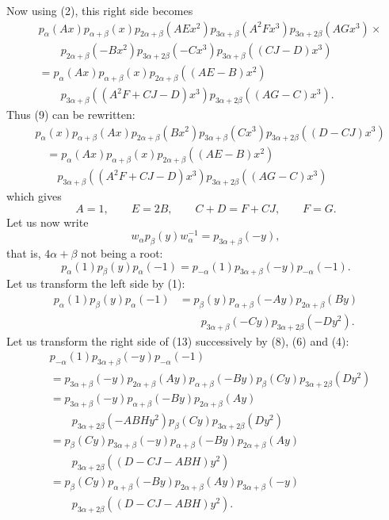 Now using (2), this right side becomes
\begin{equation}\tag{12}
\begin{aligned}
&p_\alpha(Ax)p_{\alpha+\beta}(x)p_{2\alpha+\beta}(AEx^2)p_{3\alpha+\beta}(A^2Fx^3)p_{3\alpha+2\beta}(AGx^3)\times\\
&\qquad p_{2\alpha+\beta}(-Bx^2)p_{3\alpha+2\beta}(-Cx^3)p_{3\alpha+\beta}((CJ-D)x^3)\\
&=p_\alpha(Ax)p_{\alpha+\beta}(x)p_{2\alpha+\beta}((AE-B)x^2)\\
&\qquad p_{3\alpha+\beta}((A^2F+CJ-D)x^3)p_{3\alpha+2\beta}((AG-C)x^3).
\end{aligned}
\end{equation}
Thus (9) can be rewritten:
\[
\begin{aligned}
&p_\alpha(x)p_{\alpha+\beta}(Ax)p_{2\alpha+\beta}(Bx^2)p_{3\alpha+\beta}(Cx^3)p_{3\alpha+2\beta}((D-CJ)x^3)\\
&\quad=p_\alpha(Ax)p_{\alpha+\beta}(x)p_{2\alpha+\beta}((AE-B)x^2)\\
&\qquad p_{3\alpha+\beta}((A^2F+CJ-D)x^3)p_{3\alpha+2\beta}((AG-C)x^3)
\end{aligned}
\]
which gives
\[
A=1,\qquad E=2B,\qquad C+D=F+CJ,\qquad F=G.
\]
Let us now write
\[
w_\alpha p_\beta(y)w_\alpha^{-1}=p_{3\alpha+\beta}(-y),
\]
that is, $4\alpha+\beta$ not being a root:
\begin{equation}\tag{13}
p_\alpha(1)p_\beta(y)p_\alpha(-1)=p_{-\alpha}(1)p_{3\alpha+\beta}(-y)p_{-\alpha}(-1).
\end{equation}
Let us transform the left side by (1):
\[
\begin{aligned}
p_\alpha(1)p_\beta(y)p_\alpha(-1)&=p_\beta(y)p_{\alpha+\beta}(-Ay)p_{2\alpha+\beta}(By)\\
&\qquad p_{3\alpha+\beta}(-Cy)p_{3\alpha+2\beta}(-Dy^2).
\end{aligned}
\]
Let us transform the right side of (13) successively by (8), (6) and (4):
\[
\begin{aligned}
&p_{-\alpha}(1)p_{3\alpha+\beta}(-y)p_{-\alpha}(-1)\\
&=p_{3\alpha+\beta}(-y)p_{2\alpha+\beta}(Ay)p_{\alpha+\beta}(-By)p_\beta(Cy)p_{3\alpha+2\beta}(Dy^2)\\
&=p_{3\alpha+\beta}(-y)p_{\alpha+\beta}(-By)p_{2\alpha+\beta}(Ay)\\
&\qquad p_{3\alpha+2\beta}(-ABHy^2)p_\beta(Cy)p_{3\alpha+2\beta}(Dy^2)\\
&=p_\beta(Cy)p_{3\alpha+\beta}(-y)p_{\alpha+\beta}(-By)p_{2\alpha+\beta}(Ay)\\
&\qquad p_{3\alpha+2\beta}((D-CJ-ABH)y^2)\\
&=p_\beta(Cy)p_{\alpha+\beta}(-By)p_{2\alpha+\beta}(Ay)p_{3\alpha+\beta}(-y)\\
&\qquad p_{3\alpha+2\beta}((D-CJ-ABH)y^2).
\end{aligned}
\]
